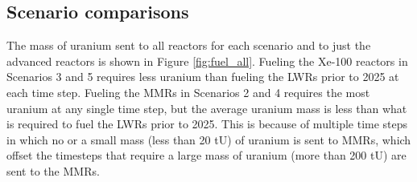 \subsection{Scenario comparisons}
The mass of uranium sent to all reactors for each scenario and to just the 
advanced reactors is shown in Figure \ref{fig:fuel_all}. Fueling the Xe-100 
reactors in Scenarios 3 and 5 requires less uranium than fueling the \glspl{LWR}
prior to 2025
at each time step. Fueling the \glspl{MMR} in Scenarios 2 and 4 requires the 
most uranium at any single time step, but the average uranium mass is less 
than what is required to fuel the \glspl{LWR} prior to 2025. This is because 
of multiple time steps in which no or a small mass (less than 20 tU) 
of uranium is sent to \glspl{MMR}, which offset the timesteps that require 
a large mass of uranium (more than 200 tU) are sent to the \glspl{MMR}. 

